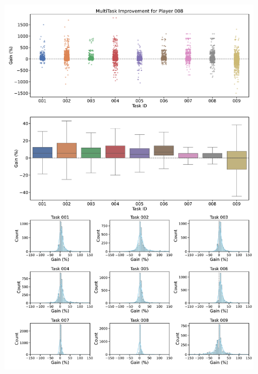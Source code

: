 \begin{figure}[ht]
  \centering
  \includegraphics[width=\textwidth]{figures/gain_validity/multitask/multitask_gain_player_00008.pdf}
\end{figure}
\clearpage

